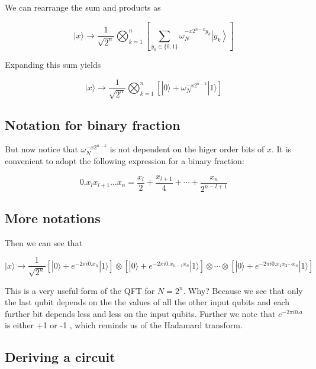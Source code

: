 \documentclass[%
oneside,                 %
final,                   %
10pt]{article}
\begin{document}
We can rearrange the sum and products as

\begin{equation*}
|x\rangle \rightarrow \frac{1}{\sqrt{2^{n}}} \bigotimes_{k=1}^{n}\left[\sum_{y_{k} \in\{0,1\}} \omega_{N}^{-x 2^{n-k} y_{k}}\left|y_{k}\right\rangle\right] 
\end{equation*}

Expanding this sum yields

\begin{equation*}
|x\rangle \rightarrow \frac{1}{\sqrt{2^{n}}} \bigotimes_{k=1}^{n}\left[|0\rangle+\omega_{N}^{-x 2^{n-k}}|1\rangle\right]
\end{equation*}

\subsection{Notation for binary fraction}

But now notice that $\omega_{N}^{-x 2^{n-k}}$ is not dependent on the
higer order bits of $x$. It is convenient to adopt the following
expression for a binary fraction:

\begin{equation*}
0 . x_{l} x_{l+1} \ldots x_{n}=\frac{x_{l}}{2}+\frac{x_{l+1}}{4}+\cdots+\frac{x_{n}}{2^{n-l+1}}
\end{equation*}

\subsection{More notations}
Then we can see that

\begin{equation*}
|x\rangle \rightarrow \frac{1}{\sqrt{2^{n}}}\left[|0\rangle+e^{-2 \pi i 0 . x_{n}}|1\rangle\right] \otimes\left[|0\rangle+e^{-2 \pi i 0 . x_{n-1} x_{n}}|1\rangle\right] \otimes \cdots \otimes\left[|0\rangle+e^{-2 \pi i 0 . x_{1} x_{2} \cdots x_{n}}|1\rangle\right] 
\end{equation*}

This is a very useful form of the QFT for $N=2^{n}$. Why? Because we
see that only the last qubit depends on the the values of all the
other input qubits and each further bit depends less and less on the
input qubits. Further we note that $e^{-2 \pi i 0 . a}$ is either +1
or -1 , which reminds us of the Hadamard transform.

\subsection{Deriving a circuit}
\end{document}
